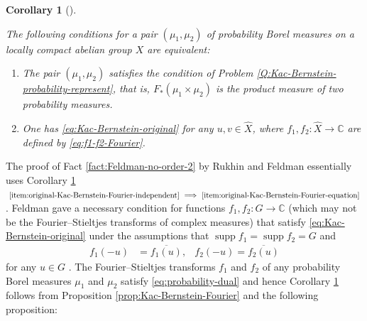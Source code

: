 \documentclass[12pt]{article}
\newtheorem{corollary}[theorem]{Corollary}
\theoremstyle{definition}
\theoremstyle{remark}
\numberwithin{equation}{section}
\numberwithin{figure}{section}
\numberwithin{table}{section}
\DeclareMathOperator{\supp}{supp}
\begin{document}
\begin{corollary}[{\cite{MR428375}}]
    \label{cor:original-Kac-Bernstein-Fourier}

The following conditions for a pair $ ( \mu_1 , \mu_2 ) $ of probability Borel measures on a locally compact abelian group $ X $ are equivalent:

\begin{enumerate}
  \item \label{item:original-Kac-Bernstein-Fourier-independent}

  The pair $ ( \mu_1 , \mu_2 ) $ satisfies the condition of Problem \ref{Q:Kac-Bernstein-probability-represent}, that is, $ F_* ( \mu_1 \times \mu_2 ) $ is the product measure of two probability measures.
  
  \item \label{item:original-Kac-Bernstein-Fourier-equation}

One has \eqref{eq:Kac-Bernstein-original} for any $ u , v \in \hat{ X } $, where $ f_1 , f_2 \colon \hat{ X } \to \mathbb{ C } $ are defined by \eqref{eq:f1-f2-Fourier}.

\end{enumerate}
    
\end{corollary}

The proof of Fact \ref{fact:Feldman-no-order-2} by Rukhin and Feldman essentially uses Corollary \ref{cor:original-Kac-Bernstein-Fourier} $ \text{ \ref{item:original-Kac-Bernstein-Fourier-independent} } \Longrightarrow \text{ \ref{item:original-Kac-Bernstein-Fourier-equation} }$.
Feldman gave a necessary condition for functions $ f_1 , f_2 \colon G \to \mathbb{ C } $ (which may not be the Fourier--Stieltjes transforms of complex measures) that satisfy \eqref{eq:Kac-Bernstein-original} under the assumptions that $ \supp f_1 = \supp f_2 = G $ and
\begin{align}
    f_1 ( - u ) & = \overline{ f_1 ( u ) }, &
    f_2 ( - u ) = \overline{ f_2 ( u ) } \label{eq:Hermitian-nonvanish}
\end{align}
for any $ u \in G $ \cite[Theorem 3.1]{MR4285097}.
The Fourier--Stieltjes transforms $ f_1 $ and $ f_2 $ of any probability Borel measures $ \mu_1 $ and $ \mu_2 $ satisfy \eqref{eq:probability-dual} and hence Corollary \ref{cor:original-Kac-Bernstein-Fourier} follows from Proposition \ref{prop:Kac-Bernstein-Fourier} and the following proposition:
\end{document}
